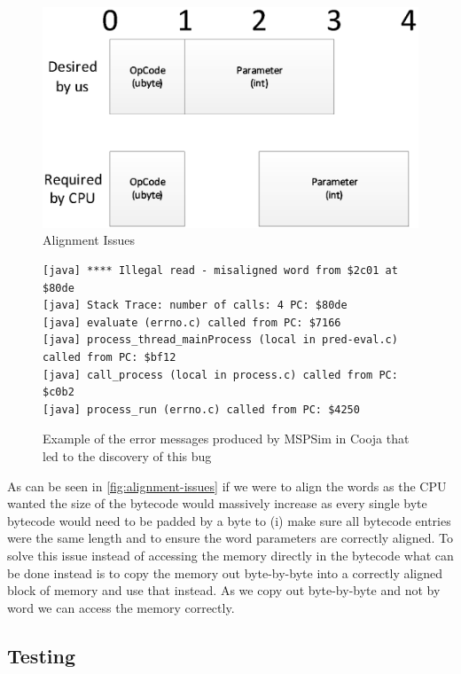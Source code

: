 \begin{figure}[ht!]
\centering
\includegraphics[scale=0.75]{Diagrams/byte-alignment.eps}
\caption{Alignment Issues}
\label{fig:alignment-issues}
\end{figure}

\begin{figure}[ht!]
\begin{verbatim}
[java] **** Illegal read - misaligned word from $2c01 at $80de
[java] Stack Trace: number of calls: 4 PC: $80de
[java] evaluate (errno.c) called from PC: $7166
[java] process_thread_mainProcess (local in pred-eval.c) called from PC: $bf12
[java] call_process (local in process.c) called from PC: $c0b2
[java] process_run (errno.c) called from PC: $4250
\end{verbatim}
\caption{Example of the error messages produced by MSPSim in Cooja that led to the discovery of this bug}
\end{figure}

As can be seen in \autoref{fig:alignment-issues} if we were to align the words as the CPU wanted the size of the bytecode would massively increase as every single byte bytecode would need to be padded by a byte to (i) make sure all bytecode entries were the same length and to ensure the word parameters are correctly aligned. To solve this issue instead of accessing the memory directly in the bytecode what can be done instead is to copy the memory out byte-by-byte into a correctly aligned block of memory and use that instead. As we copy out byte-by-byte and not by word we can access the memory correctly.

\subsection{Testing}

